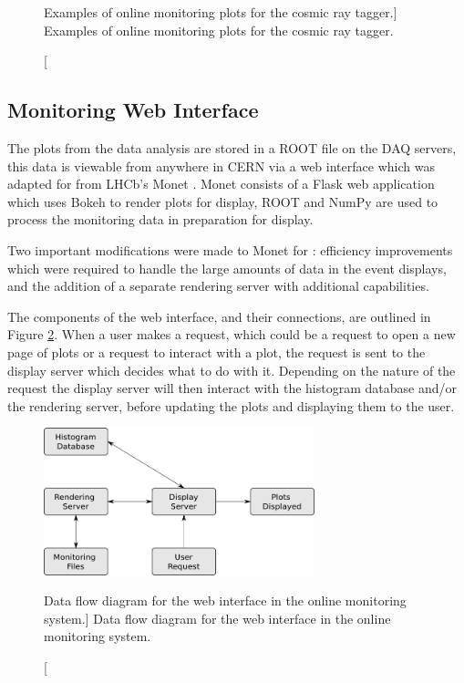 \begin{figure}
	\caption
	[Examples of online monitoring plots for the cosmic ray tagger.]
	{Examples of online monitoring plots for the cosmic ray tagger.}
	\label{fig:crt_OM}

\end{figure}

\subsection{Monitoring Web Interface}
The plots from the data analysis are stored in a ROOT file on the \protodune{}
DAQ servers, this data is viewable from anywhere in CERN via a web interface
which was adapted for \protodune{} from LHCb's Monet \cite{Adinolfi_2017}. 
Monet consists of a Flask web application \cite{flask} which uses Bokeh
\cite{bokeh} to render plots for display, ROOT \cite{ANTCHEVA20092499} and 
NumPy \cite{numpy} are used to process the monitoring data in preparation for 
display.

Two important modifications were made to Monet for \protodune{}: efficiency 
improvements which were required to handle the large amounts of data in the 
event displays, and the addition of a separate rendering server with 
additional capabilities. 

The components of the web interface, and their connections, are outlined in 
Figure \ref{fig:monet_flow}. When a user makes a request, which could be a
request to open a new page of plots or a request to interact with a plot, the 
request is sent to the display server which decides what to do with it.
Depending on the nature of the request the display server will then interact
with the histogram database and/or the rendering server, before updating the
plots and displaying them to the user. 

\begin{figure}

	\centering

	\includegraphics[width=0.7\textwidth]{figures/monet_flow.png}

	\caption
	[Data flow diagram for the web interface in the \protodune{} online 
	monitoring system.] 
	{ Data flow diagram for the web interface in the \protodune{} online 
	monitoring system. } 
	\label{fig:monet_flow}

\end{figure}

